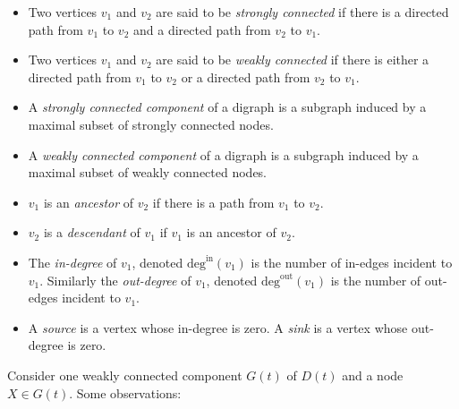 \documentclass{article}
\numberwithin{equation}{section}
\begin{document}
\begin{itemize}
  \item Two vertices $v_1$ and $v_2$ are said to be \textit{strongly
  connected} if there is a directed path from $v_1$ to $v_2$ and a directed
  path from $v_2$ to $v_1$.
  \item Two vertices $v_1$ and $v_2$ are said to be \textit{weakly connected}
  if there is either a directed path from $v_1$ to $v_2$ or a directed path
  from $v_2$ to $v_1$.
  \item A \textit{strongly connected component} of a digraph is a subgraph
  induced by a maximal subset of strongly connected nodes.
  \item A \textit{weakly connected component} of a digraph is a subgraph
  induced by a maximal subset of weakly connected nodes.
  \item $v_1$ is an \textit{ancestor} of $v_2$ if there is a path from $v_1$
  to $v_2$.
  \item $v_2$ is a \textit{descendant} of $v_1$ if $v_1$ is an ancestor of
  $v_2$.
  \item The \textit{in-degree} of $v_1$, denoted $\text{deg}^{\text{in}}(v_1)$
  is the number of in-edges incident to $v_1$.
  Similarly the \textit{out-degree} of $v_1$, denoted
  $\text{deg}^{\text{out}}(v_1)$ is the number of out-edges incident to $v_1$.
  \item A \textit{source} is a vertex whose in-degree is zero.
  A \textit{sink} is a vertex whose out-degree is zero.
\end{itemize}

Consider one weakly connected component $G(t)$ of $D(t)$ and a node
$X \in G(t)$. Some observations:
\end{document}
